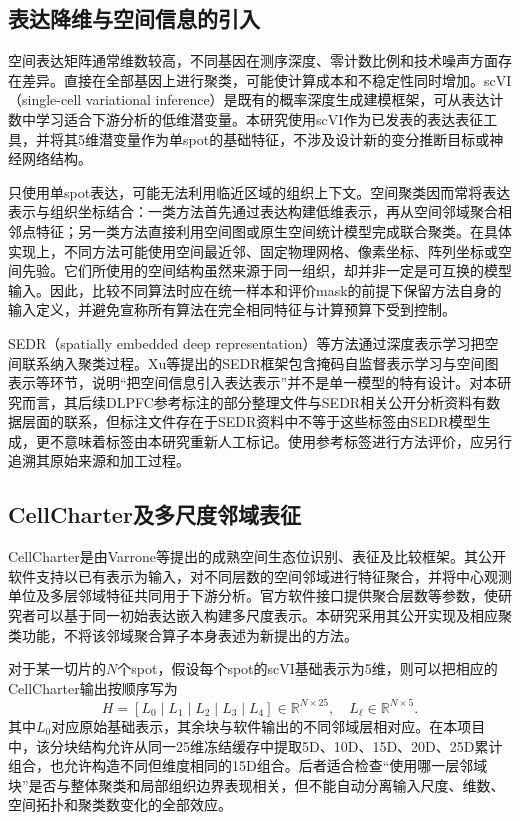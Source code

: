 \subsection{表达降维与空间信息的引入}
\label{subsec:cc-expression-v1}

空间表达矩阵通常维数较高，不同基因在测序深度、零计数比例和技术噪声方面存在差异。直接在全部基因上进行聚类，可能使计算成本和不稳定性同时增加。scVI（single-cell variational inference）是既有的概率深度生成建模框架，可从表达计数中学习适合下游分析的低维潜变量\cite{lopez2018}。本研究使用scVI作为已发表的表达表征工具，并将其5维潜变量作为单spot的基础特征，不涉及设计新的变分推断目标或神经网络结构。

只使用单spot表达，可能无法利用临近区域的组织上下文。空间聚类因而常将表达表示与组织坐标结合：一类方法首先通过表达构建低维表示，再从空间邻域聚合相邻点特征；另一类方法直接利用空间图或原生空间统计模型完成联合聚类。在具体实现上，不同方法可能使用空间最近邻、固定物理网格、像素坐标、阵列坐标或空间先验。它们所使用的空间结构虽然来源于同一组织，却并非一定是可互换的模型输入。因此，比较不同算法时应在统一样本和评价mask的前提下保留方法自身的输入定义，并避免宣称所有算法在完全相同特征与计算预算下受到控制。

SEDR（spatially embedded deep representation）等方法通过深度表示学习把空间联系纳入聚类过程。Xu等提出的SEDR框架包含掩码自监督表示学习与空间图表示等环节，说明“把空间信息引入表达表示”并不是单一模型的特有设计\cite{xu2024}。对本研究而言，其后续DLPFC参考标注的部分整理文件与SEDR相关公开分析资料有数据层面的联系，但标注文件存在于SEDR资料中不等于这些标签由SEDR模型生成，更不意味着标签由本研究重新人工标记。使用参考标签进行方法评价，应另行追溯其原始来源和加工过程。

\subsection{CellCharter及多尺度邻域表征}
\label{subsec:cc-cellcharter-v1}

CellCharter是由Varrone等提出的成熟空间生态位识别、表征及比较框架\cite{varrone2024}。其公开软件支持以已有表示为输入，对不同层数的空间邻域进行特征聚合，并将中心观测单位及多层邻域特征共同用于下游分析。官方软件接口提供聚合层数等参数，使研究者可以基于同一初始表达嵌入构建多尺度表示。本研究采用其公开实现及相应聚类功能，不将该邻域聚合算子本身表述为新提出的方法。

对于某一切片的$N$个spot，假设每个spot的scVI基础表示为5维，则可以把相应的CellCharter输出按顺序写为
\begin{equation}
H=[L_0\mid L_1\mid L_2\mid L_3\mid L_4]
\in\mathbb{R}^{N\times25},\quad L_\ell\in\mathbb{R}^{N\times5}.
\end{equation}
其中$L_0$对应原始基础表示，其余块与软件输出的不同邻域层相对应。在本项目中，该分块结构允许从同一25维冻结缓存中提取5D、10D、15D、20D、25D累计组合，也允许构造不同但维度相同的15D组合。后者适合检查“使用哪一层邻域块”是否与整体聚类和局部组织边界表现相关，但不能自动分离输入尺度、维数、空间拓扑和聚类数变化的全部效应。

